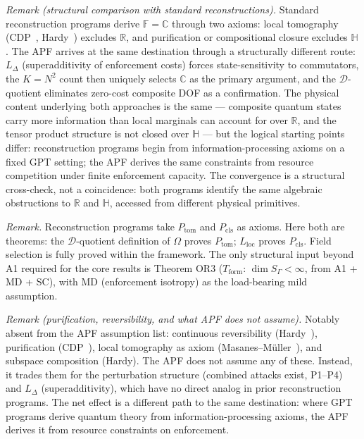 \documentclass[11pt]{article}
\theoremstyle{remark}
\begin{document}
\smallskip\noindent\textit{Remark (structural comparison with standard reconstructions).}  Standard reconstruction programs derive $\mathbb{F} = \mathbb{C}$ through two axioms: local tomography (CDP~\cite{CDP2011}, Hardy~\cite{Hardy2001}) excludes $\mathbb{R}$, and purification or compositional closure excludes $\mathbb{H}$.  The APF arrives at the same destination through a structurally different route: $L_\Delta$ (superadditivity of enforcement costs) forces state-sensitivity to commutators, the $K = N^2$ count then uniquely selects $\mathbb{C}$ as the primary argument, and the $\mathcal{D}$-quotient eliminates zero-cost composite DOF as a confirmation.  The physical content underlying both approaches is the same --- composite quantum states carry more information than local marginals can account for over $\mathbb{R}$, and the tensor product structure is not closed over $\mathbb{H}$ --- but the logical starting points differ: reconstruction programs begin from information-processing axioms on a fixed GPT setting; the APF derives the same constraints from resource competition under finite enforcement capacity.  The convergence is a structural cross-check, not a coincidence: both programs identify the same algebraic obstructions to $\mathbb{R}$ and $\mathbb{H}$, accessed from different physical primitives.

\smallskip\noindent\textit{Remark.}  Reconstruction programs take $P_{\mathrm{tom}}$ and $P_{\mathrm{cls}}$ as axioms.  Here both are theorems: the $\mathcal{D}$-quotient definition of $\Omega$ proves $P_{\mathrm{tom}}$; $L_{\mathrm{loc}}$ proves $P_{\mathrm{cls}}$.  Field selection is fully proved within the framework.  The only structural input beyond A1 required for the core results is Theorem OR3 ($T_{\mathrm{form}}$: $\dim S_\Gamma < \infty$, from A1 + MD + SC), with MD (enforcement isotropy) as the load-bearing mild assumption.

\smallskip\noindent\textit{Remark (purification, reversibility, and what APF does not assume).}  Notably absent from the APF assumption list: continuous reversibility (Hardy~\cite{Hardy2001}), purification (CDP~\cite{CDP2011}), local tomography as axiom (Masanes--M\"uller~\cite{MM2011}), and subspace composition (Hardy).  The APF does not assume any of these.  Instead, it trades them for the perturbation structure (combined attacks exist, P1--P4) and $L_\Delta$ (superadditivity), which have no direct analog in prior reconstruction programs.  The net effect is a different path to the same destination: where GPT programs derive quantum theory from information-processing axioms, the APF derives it from resource constraints on enforcement.
\end{document}
